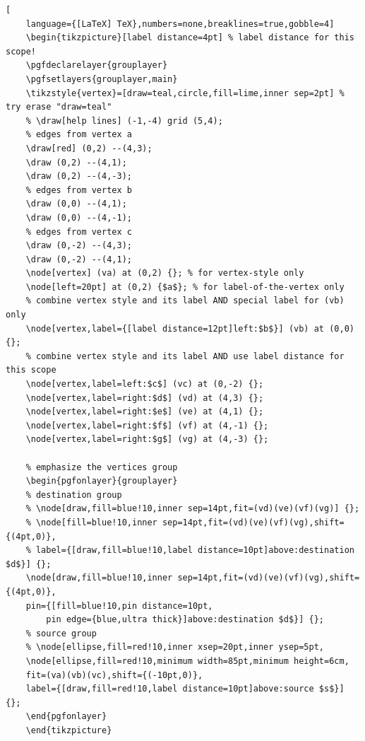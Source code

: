 \documentclass[lualatex]{jlreq}
\begin{document}
\begin{lstlisting}[
    language={[LaTeX] TeX},numbers=none,breaklines=true,gobble=4]
    \begin{tikzpicture}[label distance=4pt] % label distance for this scope!
    \pgfdeclarelayer{grouplayer}
    \pgfsetlayers{grouplayer,main}
    \tikzstyle{vertex}=[draw=teal,circle,fill=lime,inner sep=2pt] % try erase "draw=teal"
    % \draw[help lines] (-1,-4) grid (5,4);
    % edges from vertex a
    \draw[red] (0,2) --(4,3);
    \draw (0,2) --(4,1);
    \draw (0,2) --(4,-3);
    % edges from vertex b
    \draw (0,0) --(4,1);
    \draw (0,0) --(4,-1);
    % edges from vertex c
    \draw (0,-2) --(4,3);
    \draw (0,-2) --(4,1);
    \node[vertex] (va) at (0,2) {}; % for vertex-style only
    \node[left=20pt] at (0,2) {$a$}; % for label-of-the-vertex only
    % combine vertex style and its label AND special label for (vb) only
    \node[vertex,label={[label distance=12pt]left:$b$}] (vb) at (0,0) {};
    % combine vertex style and its label AND use label distance for this scope
    \node[vertex,label=left:$c$] (vc) at (0,-2) {};
    \node[vertex,label=right:$d$] (vd) at (4,3) {};
    \node[vertex,label=right:$e$] (ve) at (4,1) {};
    \node[vertex,label=right:$f$] (vf) at (4,-1) {};
    \node[vertex,label=right:$g$] (vg) at (4,-3) {};

    % emphasize the vertices group
    \begin{pgfonlayer}{grouplayer}
    % destination group
    % \node[draw,fill=blue!10,inner sep=14pt,fit=(vd)(ve)(vf)(vg)] {};
    % \node[fill=blue!10,inner sep=14pt,fit=(vd)(ve)(vf)(vg),shift={(4pt,0)},
    % label={[draw,fill=blue!10,label distance=10pt]above:destination $d$}] {};
    \node[draw,fill=blue!10,inner sep=14pt,fit=(vd)(ve)(vf)(vg),shift={(4pt,0)},
    pin={[fill=blue!10,pin distance=10pt,
        pin edge={blue,ultra thick}]above:destination $d$}] {};
    % source group
    % \node[ellipse,fill=red!10,inner xsep=20pt,inner ysep=5pt,
    \node[ellipse,fill=red!10,minimum width=85pt,minimum height=6cm,
    fit=(va)(vb)(vc),shift={(-10pt,0)},
    label={[draw,fill=red!10,label distance=10pt]above:source $s$}] {};
    \end{pgfonlayer}
    \end{tikzpicture}
\end{lstlisting}
\end{document}
